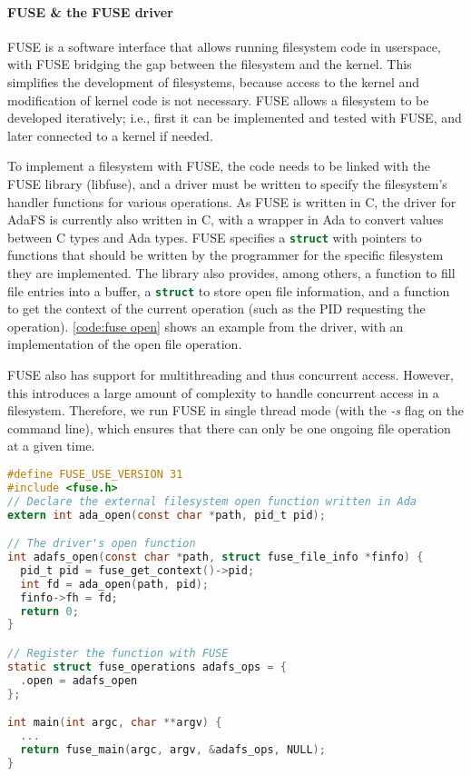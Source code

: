 \paragraph{FUSE \& the FUSE driver}
FUSE is a software interface that allows running filesystem code in userspace, with FUSE bridging the gap between the filesystem and the kernel.
This simplifies the development of filesystems, because access to the kernel and modification of kernel code is not necessary.
FUSE allows a filesystem to be developed iteratively; i.e., first it can be implemented and tested with FUSE, and later connected to a kernel if needed.

To implement a filesystem with FUSE, the code needs to be linked with the FUSE library (libfuse), and a driver must be written to specify the filesystem's handler functions for various operations.
As FUSE is written in C, the driver for AdaFS is currently also written in C, with a wrapper in Ada to convert values between C types and Ada types.
FUSE specifies a \lstinline[language=C]{struct} with pointers to functions that should be written by the programmer for the specific filesystem they are implemented.
The library also provides, among others, a function to fill file entries into a buffer, a \lstinline[language=C]{struct} to store open file information, and a function to get the context of the current operation (such as the PID requesting the operation).
\autoref{code:fuse open} shows an example from the driver, with an implementation of the open file operation.

FUSE also has support for multithreading and thus concurrent access.
However, this introduces a large amount of complexity to handle concurrent access in a filesystem.
Therefore, we run FUSE in single thread mode (with the \textit{-s} flag on the command line), which ensures that there can only be one ongoing file operation at a given time.

\begin{lstlisting}[float=tb,caption={FUSE driver implementation of \textnormal{open}}, label={code:fuse open}, language=C]
#define FUSE_USE_VERSION 31
#include <fuse.h>
// Declare the external filesystem open function written in Ada
extern int ada_open(const char *path, pid_t pid);

// The driver's open function
int adafs_open(const char *path, struct fuse_file_info *finfo) {
  pid_t pid = fuse_get_context()->pid;
  int fd = ada_open(path, pid);
  finfo->fh = fd;
  return 0;
}

// Register the function with FUSE
static struct fuse_operations adafs_ops = {
  .open = adafs_open
};

int main(int argc, char **argv) {
  ...
  return fuse_main(argc, argv, &adafs_ops, NULL);
}
\end{lstlisting}

